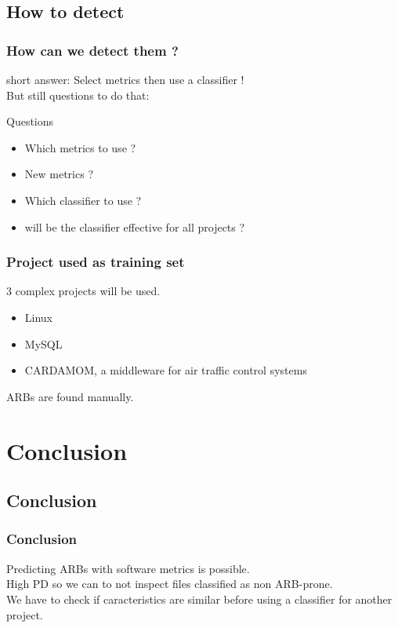 \documentclass{beamer}
\begin{document}
\subsection{How to detect}
\begin{frame}
 \frametitle{How can we detect them ?}
 short answer: \alert{Select metrics then use a classifier !}\\
 But still questions to do that:\\
 \begin{block}{Questions}
  \begin{itemize}
   \item Which metrics to use ?
   \item New metrics ?
   \item Which classifier to use ?
   \item will be the classifier effective for all projects ?
  \end{itemize}
 \end{block}
\end{frame}

\begin{frame}
 \frametitle{Project used as training set}
 3 complex projects will be used.\\
 \begin{itemize}
  \item Linux
  \item MySQL
  \item CARDAMOM, a middleware for air traffic control systems
 \end{itemize}
 \vspace{0.2cm}
 ARBs are found manually.\\
\end{frame}









\section{Conclusion}
\subsection{Conclusion}
\begin{frame}
 \frametitle{Conclusion}
 Predicting ARBs with software metrics is possible.\\
 \vspace{1cm}
 High PD so we can to not inspect files classified as non ARB-prone.\\%
 \vspace{1cm}
 We have to check if caracteristics are similar before using a classifier for another project.
\end{frame}
\end{document}
